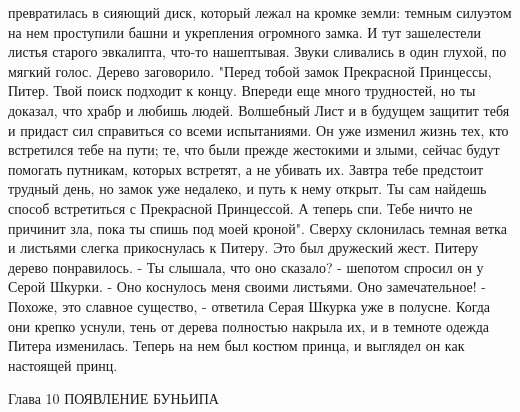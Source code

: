 превратилась в сияющий диск, который лежал на кромке земли: темным 
силуэтом на нем проступили башни и укрепления огромного замка.
    И тут зашелестели листья старого эвкалипта, что-то нашептывая. 
Звуки сливались в один глухой, по мягкий голос. Дерево заговорило.
    "Перед тобой замок Прекрасной Принцессы, Питер. Твой поиск 
подходит к концу. Впереди еще много трудностей, но ты доказал, что 
храбр и любишь людей. Волшебный Лист и в будущем защитит тебя и 
придаст сил справиться со всеми испытаниями. Он уже изменил жизнь тех, 
кто встретился тебе на пути; те, что были прежде жестокими и злыми, 
сейчас будут помогать путникам, которых встретят, а не убивать их.
    Завтра тебе предстоит трудный день, но замок уже недалеко, и путь 
к нему открыт. Ты сам найдешь способ встретиться с Прекрасной 
Принцессой. А теперь спи. Тебе ничто не причинит зла, пока ты спишь 
под моей кроной".
    Сверху склонилась темная ветка и листьями слегка прикоснулась к 
Питеру. Это был дружеский жест.
    Питеру дерево понравилось.
    - Ты слышала, что оно сказало? - шепотом спросил он у Серой 
Шкурки. - Оно коснулось меня своими листьями. Оно замечательное!
    - Похоже, это славное существо, - ответила Серая Шкурка уже в 
полусне.
    Когда они крепко уснули, тень от дерева полностью накрыла их, и в 
темноте одежда Питера изменилась. Теперь на нем был костюм принца, и 
выглядел он как настоящей принц.

        Глава 10
        ПОЯВЛЕНИЕ БУНЬИПА

